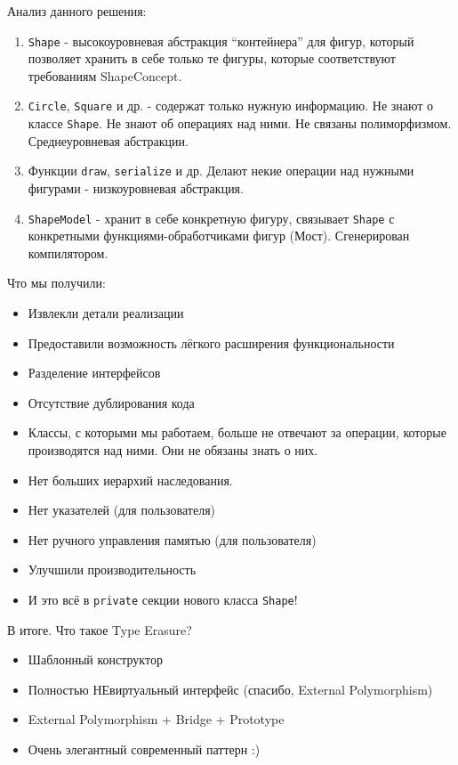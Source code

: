 \documentclass[14pt,a4paper]{article}
\providecommand{\tightlist}{%
	\setlength{\itemsep}{0pt}\setlength{\parskip}{0pt}}
\begin{document}
Анализ данного решения:

\begin{enumerate}
\def\labelenumi{\arabic{enumi}.}
\tightlist
\item
  \texttt{Shape} - высокоуровневая абстракция ``контейнера'' для фигур,
  который позволяет хранить в себе только те фигуры, которые
  соответствуют требованиям ShapeConcept.
\item
  \texttt{Circle}, \texttt{Square} и др. - содержат только нужную
  информацию. Не знают о классе \texttt{Shape}. Не знают об операциях
  над ними. Не связаны полиморфизмом. Среднеуровневая абстракции.
\item
  Функции \texttt{draw}, \texttt{serialize} и др. Делают некие операции
  над нужными фигурами - низкоуровневая абстракция.
\item
  \texttt{ShapeModel} - хранит в себе конкретную фигуру, связывает
  \texttt{Shape} с конкретными функциями-обработчиками фигур (Мост).
  Сгенерирован компилятором.
\end{enumerate}

Что мы получили:

\begin{itemize}
\tightlist
\item
  Извлекли детали реализации
\item
  Предоставили возможность лёгкого расширения функциональности
\item
  Разделение интерфейсов
\item
  Отсутствие дублирования кода
\item
  Классы, с которыми мы работаем, больше не отвечают за операции,
  которые производятся над ними. Они не обязаны знать о них.
\item
  Нет больших иерархий наследования.
\item
  Нет указателей (для пользователя)
\item
  Нет ручного управления памятью (для пользователя)
\item
  Улучшили производительность
\item
  И это всё в \texttt{private} секции нового класса \texttt{Shape}!
\end{itemize}

В итоге. Что такое Type Erasure?

\begin{itemize}
\tightlist
\item
  Шаблонный конструктор
\item
  Полностью НЕвиртуальный интерфейс (спасибо, External Polymorphism)
\item
  External Polymorphism + Bridge + Prototype
\item
  Очень элегантный современный паттерн :)
\end{itemize}
\end{document}
